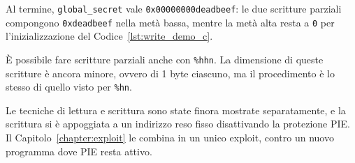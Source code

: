 Al termine, \texttt{global\_secret} vale \texttt{0x00000000deadbeef}: le due scritture parziali compongono \texttt{0xdeadbeef} nella metà bassa, mentre la metà alta resta a \texttt{0} per l'inizializzazione del Codice~\ref{lst:write_demo_c}.

È possibile fare scritture parziali anche con \texttt{\%hhn}. La dimensione di queste scritture è ancora minore, ovvero di 1 byte ciascuno, ma il procedimento è lo stesso di quello visto per \texttt{\%hn}.

Le tecniche di lettura e scrittura sono state finora mostrate separatamente, e la scrittura si è appoggiata a un indirizzo reso fisso disattivando la protezione PIE. 
Il Capitolo~\ref{chapter:exploit} le combina in un unico exploit, contro un nuovo programma dove PIE resta attivo.
